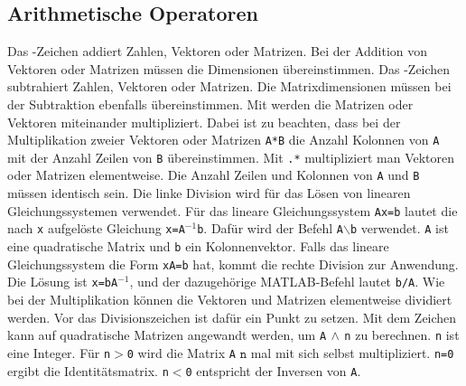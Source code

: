 {\subsection{Arithmetische Operatoren}
Das \boxed{\textbf{\texttt{+}}}-Zeichen addiert Zahlen, Vektoren oder Matrizen. Bei der Addition von Vektoren oder Matrizen müssen die Dimensionen übereinstimmen.
\newline\newline
Das \boxed{\textbf{\texttt{-}}}-Zeichen subtrahiert Zahlen, Vektoren oder Matrizen. Die Matrixdimensionen müssen bei der Subtraktion ebenfalls übereinstimmen.
\newline\newline
Mit \boxed{\textbf{\texttt{*}}} werden die Matrizen oder Vektoren miteinander multipliziert. Dabei ist zu beachten, dass bei der Multiplikation zweier Vektoren oder Matrizen \texttt{A*B} die Anzahl Kolonnen von \texttt{A} mit der Anzahl Zeilen von \texttt{B} übereinstimmen. Mit {\color{red}\texttt{.*}} multipliziert man Vektoren oder Matrizen elementweise. Die Anzahl Zeilen und Kolonnen von \texttt{A} und \texttt{B} müssen identisch sein.
\newline\newline
Die linke Division \boxed{\textbf{\texttt{$\backslash$}}} wird für das Lösen von linearen Gleichungssystemen verwendet. Für das lineare Gleichungssystem \texttt{Ax=b} lautet die nach \texttt{x} aufgelöste Gleichung \texttt{x=A$^{-1}$b}. Dafür wird der Befehl \texttt{A$\backslash$b} verwendet. \texttt{A} ist eine quadratische Matrix und \texttt{b} ein Kolonnenvektor.
\newline\newline
Falls das lineare Gleichungssystem die Form \texttt{xA=b} hat, kommt die rechte Division \boxed{\textbf{\texttt{/}}} zur Anwendung. Die Lösung ist \texttt{x=bA$^{-1}$}, und der dazugehörige MATLAB-Befehl lautet \texttt{b/A}. Wie bei der Multiplikation können die Vektoren und Matrizen elementweise dividiert werden. Vor das Divisionszeichen ist dafür ein Punkt zu setzen.
\newline\newline
Mit dem Zeichen \boxed{\textbf{\texttt{\^}}} kann auf quadratische Matrizen angewandt werden, um \texttt{A$\,\wedge\,$n} zu berechnen. \texttt{n} ist eine Integer. Für \texttt{n$>$0} wird die Matrix \texttt{A} $\texttt{n}$ mal mit sich selbst multipliziert. \texttt{n=0} ergibt die Identitätsmatrix. \texttt{n$<$0} entspricht der Inversen von \texttt{A}.
}
